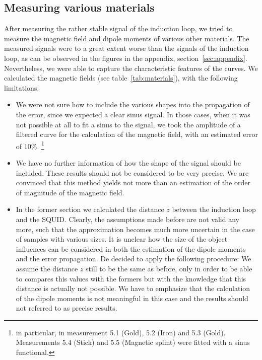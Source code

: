 \subsection{Measuring various materials}
After measuring the rather stable signal of the induction loop, we tried to measure
the magnetic field and dipole moments of various other materials. 
The measured signals were to a great extent worse than the signals of the induction loop,
as can be observed in the figures in the appendix, section~\ref{sec:appendix}. 
Nevertheless, we were able to capture the characteristic features of the curves. 
We calculated the magnetic fields (see table~\ref{tab:materials}), with the following limitations: 
\begin{itemize}
    \item We were not sure how to include the various shapes into the propagation of the error, since
        we expected a clear sinus signal. In those cases, when it was not possible at all to fit a sinus
        to the signal, we took the amplitude of a filtered curve for the calculation of the magnetic field, with
        an estimated error of 10\%. %
        \footnote{in particular, in measurement 5.1 (Gold), 5.2 (Iron) and 5.3 (Gold).
        Measurements 5.4 (Stick) and 5.5 (Magnetic splint) were fitted with a sinus functional.}
    \item We have no further information of how
        the shape of the signal should be included. These results should not be considered to be very precise.
        We are convinced that this method yields not more than an estimation of the order
        of magnitude of the magnetic field.
    \item In the former section we calculated the distance $z$ between the induction loop and the 
        SQUID. Clearly, the assumptions made before are not valid any more, such that the approximation 
        becomes much more uncertain in the case of samples with various sizes. It is
        unclear how the size of the object influences can be considered in both the estimation of the 
        dipole moments and the error propagation. De decided to apply the following procedure:
        We assume the distance $z$ still to be the same as before, only in order to be able to 
        compares this values with the formers but with the knowledge that this distance is actually not 
        possible. We have to emphasize that the calculation of the dipole moments is not meaningful
        in this case and the results should not referred to as precise results.
\end{itemize}

